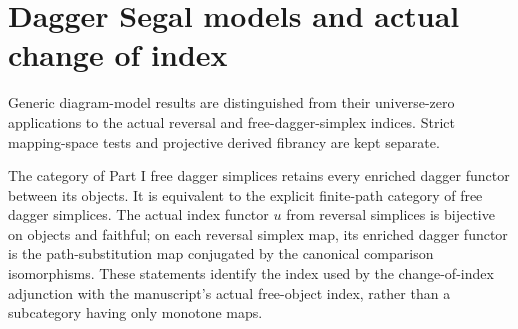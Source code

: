 \section{Dagger Segal models and actual change of index}

Generic diagram-model results are distinguished from their universe-zero applications to the actual reversal and free-dagger-simplex indices. Strict mapping-space tests and projective derived fibrancy are kept separate.

\begin{resultblock}
\begin{proposition}
\label{catalogue:B1}
The category of Part I free dagger simplices retains every enriched dagger functor between its objects.
It is equivalent to the explicit finite-path category of free dagger simplices.
The actual index functor $u$ from reversal simplices is bijective on objects and faithful;
on each reversal simplex map, its enriched dagger functor is the path-substitution map conjugated by the canonical comparison isomorphisms.
These statements identify the index used by the change-of-index adjunction with the manuscript's actual free-object index, rather than a subcategory having only monotone maps.
\end{proposition}

\end{resultblock}


